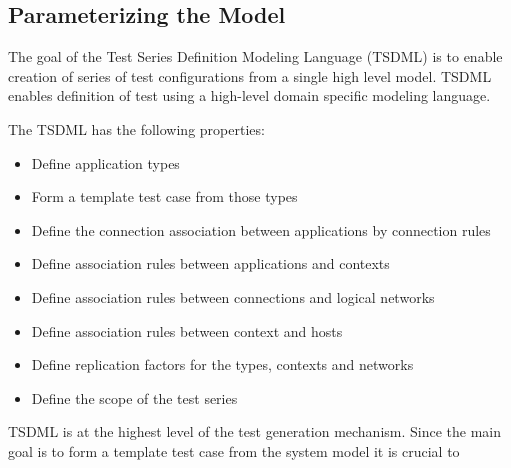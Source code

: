 \subsection{Parameterizing the Model}

The goal of the Test Series Definition Modeling Language (TSDML) is to enable creation of series of test configurations from a single high level model. TSDML enables definition of test using a high-level domain specific modeling language. 

The TSDML has the following properties:

\begin{itemize}
	\item Define application types
	\item Form a template test case from those types
	\item Define the connection association between applications by connection rules
	\item Define association rules between applications and contexts
	\item Define association rules between connections and logical networks
	\item Define association rules between context and hosts
	\item Define replication factors for the types, contexts and networks
	\item Define the scope of the test series
\end{itemize}


TSDML is at the highest level of the test generation mechanism. Since the main goal is to form a template test case from the system model it is crucial to 
